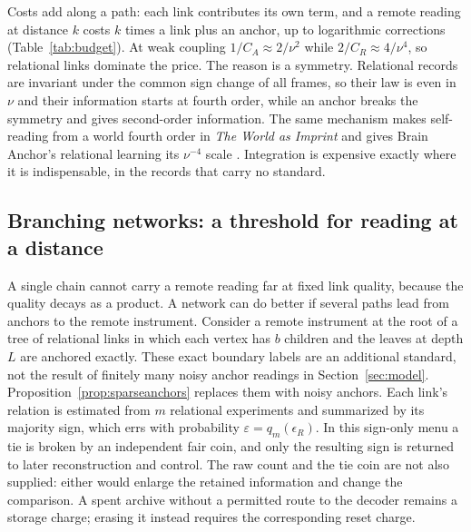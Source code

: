 \documentclass[11pt,a4paper]{article}
\begin{document}
Costs add along a path: each link contributes its own term, and a remote reading at distance $k$ costs $k$ times a link plus an anchor, up to logarithmic corrections (Table~\ref{tab:budget}). At weak coupling $1/C_A\approx2/\nu^2$ while $2/C_R\approx4/\nu^4$, so relational links dominate the price. The reason is a symmetry. Relational records are invariant under the common sign change of all frames, so their law is even in $\nu$ and their information starts at fourth order, while an anchor breaks the symmetry and gives second-order information. The same mechanism makes self-reading from a world fourth order in \emph{The World as Imprint} \cite{WorldImprint} and gives Brain Anchor's relational learning its $\nu^{-4}$ scale \cite{BrainAnchor}. Integration is expensive exactly where it is indispensable, in the records that carry no standard.

\subsection{Branching networks: a threshold for reading at a distance}

A single chain cannot carry a remote reading far at fixed link quality, because the quality decays as a product. A network can do better if several paths lead from anchors to the remote instrument. Consider a remote instrument at the root of a tree of relational links in which each vertex has $b$ children and the leaves at depth $L$ are anchored exactly. These exact boundary labels are an additional standard, not the result of finitely many noisy anchor readings in Section~\ref{sec:model}. Proposition~\ref{prop:sparseanchors} replaces them with noisy anchors. Each link's relation is estimated from $m$ relational experiments and summarized by its majority sign, which errs with probability $\varepsilon=q_m(\epsilon_R)$. In this sign-only menu a tie is broken by an independent fair coin, and only the resulting sign is returned to later reconstruction and control. The raw count and the tie coin are not also supplied: either would enlarge the retained information and change the comparison. A spent archive without a permitted route to the decoder remains a storage charge; erasing it instead requires the corresponding reset charge.
\end{document}
